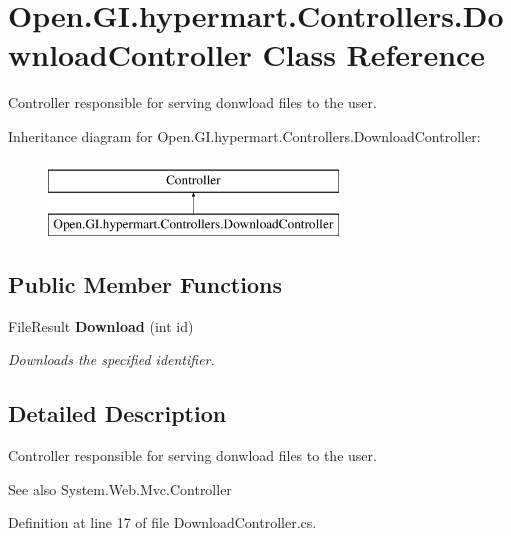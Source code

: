 \section{Open.\+G\+I.\+hypermart.\+Controllers.\+Download\+Controller Class Reference}
\label{class_open_1_1_g_i_1_1hypermart_1_1_controllers_1_1_download_controller}


Controller responsible for serving donwload files to the user.  


Inheritance diagram for Open.\+G\+I.\+hypermart.\+Controllers.\+Download\+Controller\+:\begin{figure}[H]
\begin{center}
\leavevmode
\includegraphics[height=2.000000cm]{class_open_1_1_g_i_1_1hypermart_1_1_controllers_1_1_download_controller}
\end{center}
\end{figure}
\subsection*{Public Member Functions}
\begin{DoxyCompactItemize}
\item 
File\+Result \textbf{ Download} (int id)
\begin{DoxyCompactList}\small\item\em Downloads the specified identifier. \end{DoxyCompactList}\end{DoxyCompactItemize}


\subsection{Detailed Description}
Controller responsible for serving donwload files to the user. 

\begin{DoxySeeAlso}{See also}
System.\+Web.\+Mvc.\+Controller


\end{DoxySeeAlso}


Definition at line 17 of file Download\+Controller.\+cs.




